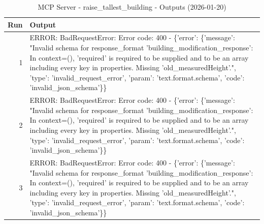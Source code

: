 \begin{table}[ht]
\centering
\small
\caption{MCP Server - raise\_tallest\_building - Outputs (2026-01-20)}
\label{tab:mcp\_raise\_tallest\_building\_outputs\_2026-01-20}
\begin{tabularx}{\linewidth}{r X}
\hline
Run & Output \\
\hline
1 & ERROR: BadRequestError: Error code: 400 - \{'error': \{'message': "Invalid schema for response\_format 'building\_modification\_response': In context=(), 'required' is required to be supplied and to be an array including every key in properties. Missing 'old\_measuredHeight'.", 'type': 'invalid\_request\_error', 'param': 'text.format.schema', 'code': 'invalid\_json\_schema'\}\} \\
2 & ERROR: BadRequestError: Error code: 400 - \{'error': \{'message': "Invalid schema for response\_format 'building\_modification\_response': In context=(), 'required' is required to be supplied and to be an array including every key in properties. Missing 'old\_measuredHeight'.", 'type': 'invalid\_request\_error', 'param': 'text.format.schema', 'code': 'invalid\_json\_schema'\}\} \\
3 & ERROR: BadRequestError: Error code: 400 - \{'error': \{'message': "Invalid schema for response\_format 'building\_modification\_response': In context=(), 'required' is required to be supplied and to be an array including every key in properties. Missing 'old\_measuredHeight'.", 'type': 'invalid\_request\_error', 'param': 'text.format.schema', 'code': 'invalid\_json\_schema'\}\} \\
\hline
\end{tabularx}
\end{table}
